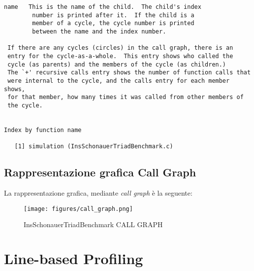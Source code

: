 \begin{lstlisting}[breaklines=true]
     name	This is the name of the child.  The child's index
		number is printed after it.  If the child is a
		member of a cycle, the cycle number is printed
		between the name and the index number.

 If there are any cycles (circles) in the call graph, there is an
 entry for the cycle-as-a-whole.  This entry shows who called the
 cycle (as parents) and the members of the cycle (as children.)
 The `+' recursive calls entry shows the number of function calls that
 were internal to the cycle, and the calls entry for each member shows,
 for that member, how many times it was called from other members of
 the cycle.


Index by function name

   [1] simulation (InsSchonauerTriadBenchmark.c)

\end{lstlisting}

\subsection{Rappresentazione grafica Call Graph}

La rappresentazione grafica, mediante \textit{call graph} è la seguente:

\begin{center}
\begin{figure}[H]
\centering
\texttt{[image: figures/call\_graph.png]}
\caption{InsSchonauerTriadBenchmark CALL GRAPH}
\end{figure}
\end{center}

\section{Line-based Profiling}

